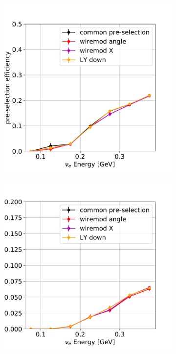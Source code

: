 \documentclass[a4paper]{article}
\begin{document}
\begin{figure}[H] 
\begin{center}
    \begin{subfigure}[b]{0.3\textwidth}
    \centering
    \includegraphics[width=1.00\textwidth]{detsys/nu_e01162020_presel_eff.pdf}
    \end{subfigure}
    \begin{subfigure}[b]{0.3\textwidth}
    \centering
    \includegraphics[width=1.00\textwidth]{detsys/nu_e01162020_boxcuts_eff.pdf}

\end{subfigure}
\end{center}
\end{figure}
\end{document}
